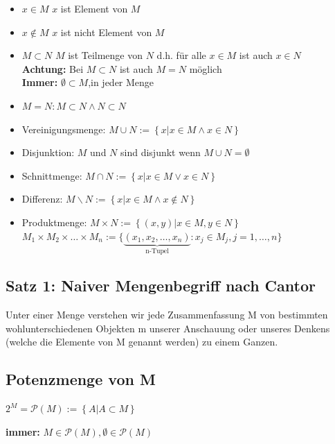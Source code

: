 \documentclass[fleqn]{scrbook}
\newcommand{\qq}[1]{\glqq #1\grqq}
\newcommand{\q}[1]{\glq #1\grq}
\newenvironment{example}{{\bfseries Beispiel }}{}
\begin{document}
\begin{itemize}
  \item $x \in M$ $x$ ist Element von $M$
  \item $x \notin M$ $x$ ist nicht Element von $M$
  \item $M \subset N$ $M$ ist Teilmenge von $N$
  d.h. für alle $x \in M$ ist auch $x \in N$ \\
  \textbf{Achtung:} Bei $M \subset N $ ist auch $M = N$ möglich \\
  \textbf{Immer:} $\emptyset \subset M$,in jeder Menge
  \item $M=N: M \subset N \wedge N \subset N$
  \item Vereinigungsmenge: $M \cup N := \left\{ x|x \in M \wedge x \in N\right\}$
  \item Disjunktion: $M$ und $N$ sind disjunkt wenn $M  \cup N = \emptyset$ 
  \item Schnittmenge: $M \cap N := \left\{ x|x \in M \vee x \in N\right\}$ 
  \item Differenz: $M \backslash N := \left\{ x|x \in M \wedge x \notin N \right\}$ 
  \item Produktmenge: $M \times N:= \left\{ (x,y)|x \in M, y \in N \right\}$  \\
  $M_1 \times M_2 \times \ldots \times M_n := \{ \underbrace{(x_1,x_2,\ldots,x_n)}_{\text{n-Tupel}} : x_j \in M_j, j= 1,\ldots,n \}$
\end{itemize}

\subsection{Satz 1: \qq{Naiver} Mengenbegriff nach Cantor}

\qq{Unter einer \q{Menge} verstehen wir jede Zusammenfassung M von bestimmten wohlunterschiedenen Objekten m unserer Anschauung oder unseres Denkens (welche die \q{Elemente} von M genannt werden) zu einem Ganzen.}

\subsection{Potenzmenge von M}

$2^M = \mathcal{P}(M) := \left\{ A | A \subset M \right\}$

\textbf{immer:} $ M \in \mathcal{P}(M), \emptyset \in \mathcal{P}(M)$ 

\begin{example}{$\mathcal{P}(\emptyset) = \left\{ \emptyset \right\}$}
\end{example}
\end{document}
